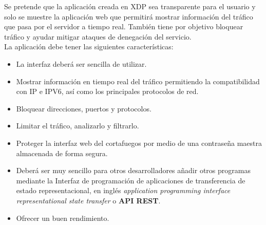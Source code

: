 Se pretende que la aplicación creada en XDP sea transparente para el usuario y solo se muestre la aplicación web que permitirá mostrar información del tráfico que pasa por el servidor a tiempo real. También tiene por objetivo bloquear tráfico y ayudar mitigar ataques de denegación del servicio.
\\La aplicación debe tener las siguientes características:
\begin{itemize}
        \item La interfaz deberá ser sencilla de utilizar.
        \item Mostrar información en tiempo real del tráfico permitiendo la compatibilidad con IP e IPV6, así como los principales protocolos de red.
        \item Bloquear direcciones, puertos y protocolos.
        \item Limitar el tráfico, analizarlo y filtrarlo.
        \item Proteger la interfaz web del cortafuegos por medio de una contraseña maestra almacenada de forma segura.
        \item Deberá ser muy sencillo para otros desarrolladores añadir otros programas mediante la Interfaz de programación de aplicaciones de transferencia de estado representacional, en inglés \textit{application programming interface representational state transfer }o \textbf{API REST}.
        \item Ofrecer un buen rendimiento.
\end{itemize}
